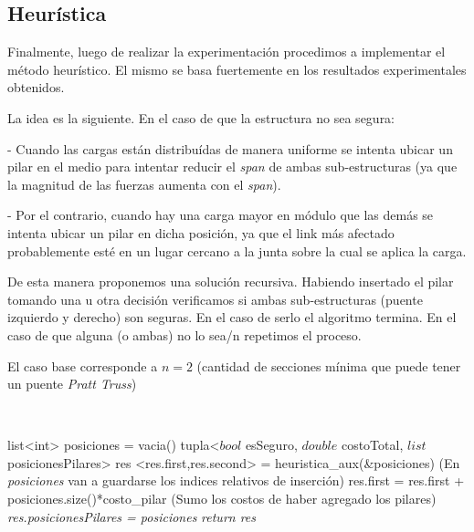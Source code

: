 



\subsection{Heurística}

Finalmente, luego de realizar la experimentación procedimos a implementar el método heurístico. El mismo se basa fuertemente
en los resultados experimentales obtenidos.

La idea es la siguiente. En el caso de que la estructura no sea segura:

- Cuando las cargas están distribuídas de manera uniforme se intenta ubicar un pilar en el medio para intentar reducir el
\emph{span} de ambas sub-estructuras (ya que la magnitud de las fuerzas aumenta con el \emph{span}).

- Por el contrario, cuando hay una carga mayor en módulo que las demás se intenta ubicar un pilar en dicha posición,
ya que el link más afectado probablemente esté en un lugar cercano a la junta sobre la cual se aplica la carga.

De esta manera proponemos una solución recursiva. Habiendo insertado el pilar tomando una u otra decisión verificamos
si ambas sub-estructuras (puente izquierdo y derecho) son seguras. En el caso de serlo el algoritmo termina. En el caso
de que alguna (o ambas) no lo sea/n repetimos el proceso.

El caso base corresponde a $n=2$ (cantidad de secciones mínima que puede tener un puente \emph{Pratt Truss})

~

\begin{algorithmic}
	\State list<int> posiciones = vacia()
	\State tupla<$bool$ esSeguro, $double$ costoTotal, $list$ posicionesPilares> res
	\State <res.first,res.second> = heuristica\_aux(\&posiciones)
	\State (En \emph{posiciones} van a guardarse los indices relativos de inserción)
	\State res.first = res.first + posiciones.size()*costo\_pilar
	\State (Sumo los costos de haber agregado los pilares)
	\State \emph{res.posicionesPilares = posiciones}
	\State \emph{return res}
\EndFunction
\end{algorithmic}

~

